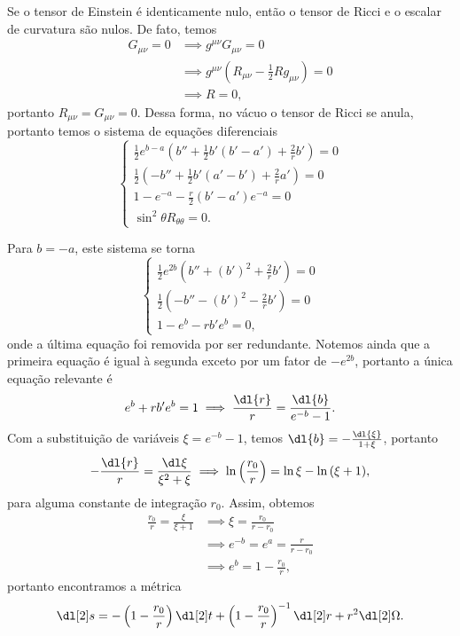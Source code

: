 Se o tensor de Einstein é identicamente nulo, então o tensor de Ricci e o escalar de curvatura são nulos. De fato, temos
\begin{align*}
    G_{\mu\nu} = 0 &\implies g^{\mu\nu} G_{\mu\nu} = 0\\
                   &\implies g^{\mu\nu}\left(R_{\mu\nu} - \frac12R g_{\mu\nu}\right) = 0\\
                   &\implies R = 0,
\end{align*}
portanto \(R_{\mu\nu} = G_{\mu\nu} = 0.\) Dessa forma, no vácuo o tensor de Ricci se anula, portanto temos o sistema de equações diferenciais
\begin{equation*}
    \begin{cases}
    \frac12 e^{b-a}\left(b'' + \frac12b'(b'-a') + \frac2rb'\right) = 0\\
    \frac12\left(-b'' + \frac12b'(a'-b') + \frac2ra'\right) = 0\\
    1 - e^{-a} - \frac{r}2(b' - a')e^{-a} = 0\\
    \sin^2\theta R_{\theta\theta} = 0.
    \end{cases}
\end{equation*}

Para \(b = -a\), este sistema se torna
\begin{equation*}
    \begin{cases}
    \frac12 e^{2b}\left(b'' + (b')^2 + \frac2rb'\right) = 0\\
    \frac12\left(-b'' - (b')^2 - \frac2rb'\right) = 0\\
    1 - e^{b} - rb'e^{b} = 0,
    \end{cases}
\end{equation*}
onde a última equação foi removida por ser redundante. Notemos ainda que a primeira equação é igual à segunda exceto por um fator de \(-e^{2b}\), portanto a única equação relevante é
\begin{equation*}
    e^b + rb' e^b = 1 \implies \frac{\dl{r}}{r} = \frac{\dl{b}}{e^{-b} - 1}.
\end{equation*}
Com a substituição de variáveis \(\xi = e^{-b} - 1\), temos \(\dl{b} = - \frac{\dl{\xi}}{1+\xi}\), portanto
\begin{equation*}
    -\frac{\dl{r}}{r} = \frac{\dl\xi}{\xi^2 + \xi} \implies \ln\left(\frac{r_0}{r}\right) = \ln{\xi} - \ln{(\xi + 1)},
\end{equation*}
para alguma constante de integração \(r_0\). Assim, obtemos
\begin{align*}
    \frac{r_0}{r} = \frac{\xi}{\xi + 1} &\implies \xi = \frac{r_0}{r-r_0}\\
                                        &\implies e^{-b} = e^{a} = \frac{r}{r-r_0}\\
                                        &\implies e^{b} = 1 - \frac{r_0}{r},
\end{align*}
portanto encontramos a métrica
\begin{equation*}
    \dl[2]s = -\left(1 - \frac{r_0}{r}\right)\dl[2]t + \left(1 - \frac{r_0}{r}\right)^{-1}\dl[2]r + r^2 \dl[2]\Omega.
\end{equation*}

